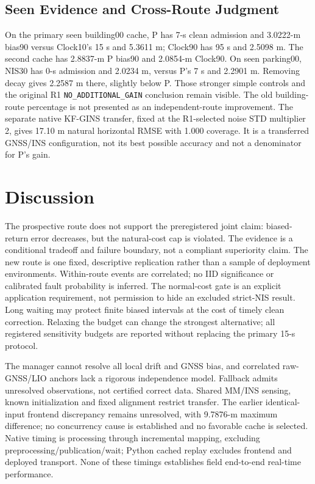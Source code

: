 \documentclass[conference]{IEEEtran}
\begin{document}
\subsection{Seen Evidence and Cross-Route Judgment}
On the primary seen building00 cache, P has 7-s clean admission and 3.0222-m bias90 versus Clock10's 15 s and 5.3611 m; Clock90 has 95 s and 2.5098 m. The second cache has 2.8837-m P bias90 and 2.0854-m Clock90. On seen parking00, NIS30 has 0-s admission and 2.0234 m, versus P's 7 s and 2.2901 m. Removing decay gives 2.2587 m there, slightly below P. Those stronger simple controls and the original R1 \texttt{NO\_ADDITIONAL\_GAIN} conclusion remain visible. The old building-route percentage is not presented as an independent-route improvement. The separate native KF-GINS transfer, fixed at the R1-selected noise STD multiplier 2, gives 17.10 m natural horizontal RMSE with 1.000 coverage. It is a transferred GNSS/INS configuration, not its best possible accuracy and not a denominator for P's gain.

\section{Discussion}
The prospective route does not support the preregistered joint claim: biased-return error decreases, but the natural-cost cap is violated. The evidence is a conditional tradeoff and failure boundary, not a compliant superiority claim. The new route is one fixed, descriptive replication rather than a sample of deployment environments. Within-route events are correlated; no IID significance or calibrated fault probability is inferred. The normal-cost gate is an explicit application requirement, not permission to hide an excluded strict-NIS result. Long waiting may protect finite biased intervals at the cost of timely clean correction. Relaxing the budget can change the strongest alternative; all registered sensitivity budgets are reported without replacing the primary 15-s protocol.

The manager cannot resolve all local drift and GNSS bias, and correlated raw-GNSS/LIO anchors lack a rigorous independence model. Fallback admits unresolved observations, not certified correct data. Shared MM/INS sensing, known initialization and fixed alignment restrict transfer. The earlier identical-input frontend discrepancy remains unresolved, with 9.7876-m maximum difference; no concurrency cause is established and no favorable cache is selected. Native timing is processing through incremental mapping, excluding preprocessing/publication/wait; Python cached replay excludes frontend and deployed transport. None of these timings establishes field end-to-end real-time performance.
\end{document}
